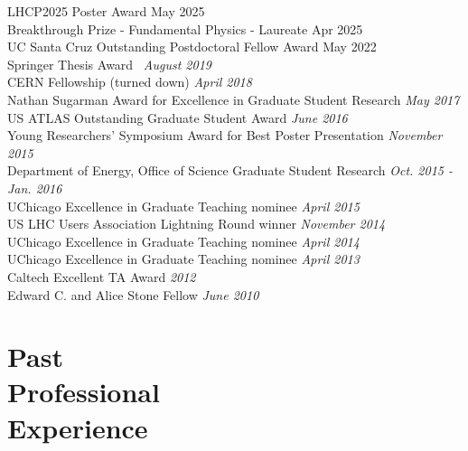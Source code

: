 \documentclass[margin,line]{resume}
\let\origsection\section%
\let\section\subsection%
\let\section\origsection%
\begin{document}
\begin{resume}
LHCP2025 Poster Award \hfill{May 2025}\\
Breakthrough Prize - Fundamental Physics - Laureate \hfill{Apr 2025}\\
UC Santa Cruz Outstanding Postdoctoral Fellow Award \hfill{May 2022}\\
Springer Thesis Award~\cite{Stark2020} \hfill \textsl{August 2019}\\
CERN Fellowship (turned down) \hfill \textsl{April 2018}\\
Nathan Sugarman Award for Excellence in Graduate Student Research \hfill \textsl{May 2017}\\
US ATLAS Outstanding Graduate Student Award \hfill \textsl{June 2016}\\
Young Researchers' Symposium Award for Best Poster Presentation \hfill \textsl{November 2015}\\
Department of Energy, Office of Science Graduate Student Research \hfill \textsl{Oct. 2015 - Jan. 2016}\\
UChicago Excellence in Graduate Teaching nominee \hfill \textsl{April 2015}\\
US LHC Users Association Lightning Round winner \hfill \textsl{November 2014}\\
UChicago Excellence in Graduate Teaching nominee \hfill \textsl{April 2014}\\
UChicago Excellence in Graduate Teaching nominee \hfill \textsl{April 2013}\\
Caltech Excellent TA Award \hfill \textsl{2012}\\
Edward C. and Alice Stone Fellow \hfill \textsl{June 2010}


\section{\mysidestyle Past\\Professional\\Experience}


\end{resume}
\end{document}
